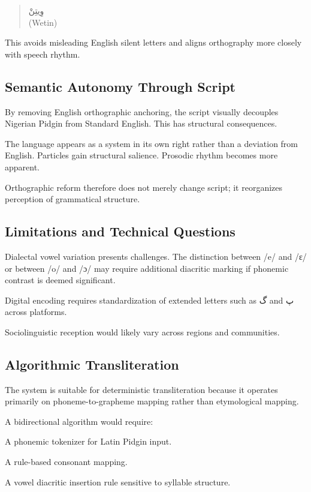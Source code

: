 \documentclass[12pt]{article}
\newcommand{\AR}[1]{\foreignlanguage{arabic}{#1}}
\begin{document}
\begin{quote}
\AR{وِيتِنْ} \\
(Wetin)
\end{quote}

This avoids misleading English silent letters and aligns orthography more closely with speech rhythm.

\subsection{Semantic Autonomy Through Script}

By removing English orthographic anchoring, the script visually decouples Nigerian Pidgin from Standard English. This has structural consequences.

The language appears as a system in its own right rather than a deviation from English. Particles gain structural salience. Prosodic rhythm becomes more apparent.

Orthographic reform therefore does not merely change script; it reorganizes perception of grammatical structure.

\subsection{Limitations and Technical Questions}

Dialectal vowel variation presents challenges. The distinction between /e/ and /ɛ/ or between /o/ and /ɔ/ may require additional diacritic marking if phonemic contrast is deemed significant.

Digital encoding requires standardization of extended letters such as \AR{گ} and \AR{پ} across platforms.

Sociolinguistic reception would likely vary across regions and communities.

\subsection{Algorithmic Transliteration}

The system is suitable for deterministic transliteration because it operates primarily on phoneme-to-grapheme mapping rather than etymological mapping.

A bidirectional algorithm would require:

A phonemic tokenizer for Latin Pidgin input.

A rule-based consonant mapping.

A vowel diacritic insertion rule sensitive to syllable structure.
\end{document}
